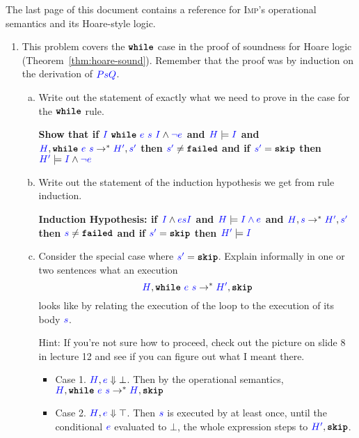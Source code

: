 \documentclass{article}
\theoremstyle{definition}
\newcommand{\meta}[1]{{\color{blue}#1}}
\newcommand{\imp}{\textsc{Imp}}
\newcommand{\progtext}[1]{\ensuremath{\text{\ttfamily\bfseries #1}}}
\newcommand{\impskip}{\progtext{skip}}
\newcommand{\failed}{\progtext{failed}}
\newcommand{\while}{\progtext{while}}
\begin{document}
\noindent{}The last page of this document contains a reference for \imp{}'s operational semantics and its Hoare-style logic.
\begin{enumerate}[start=1,label={{\bf Problem \arabic*}.},ref=\arabic*,left=0pt..0pt,widest*=10,align=left,itemindent=*]
\item This problem covers the $\while$ case in the proof of soundness for Hoare
  logic (Theorem~\ref{thm:hoare-sound}). Remember that the proof was by
  induction on the derivation of $\set{\meta{P}}\meta{s}\set{\meta{Q}}$.
  \begin{enumerate}[(a),left=1em]
  \item Write out the statement of exactly what we need to prove in the case for the $\while$ rule.
  
    \textbf{Show that if $\set{\meta{I}}\ \while\ \meta{e}\ \meta{s}\ \set{\meta{I}\wedge\meta{\neg e}}$ and $\meta{H}\models \meta{I}$ and $\meta{H},\while\ \meta{e}\ \meta{s} \to^* \meta{H^\prime},\meta{s^\prime}$ then $\meta{s^\prime}\neq \failed$ and if $\meta{s^\prime}=\impskip$ then $\meta{H^\prime} \models \meta{I}\wedge \meta{\neg e}$}

  \item Write out the statement of the induction hypothesis we get from rule induction.
  
  \textbf{Induction Hypothesis: if $\set{\meta{I}\wedge \meta{e}}\meta{s}\set{\meta{I}}$ and $\meta{H}\models\meta{\meta{I}\wedge \meta{e}}$ and $\meta{H},\meta{s}\to^* \meta{H^\prime},\meta{s^\prime}$ then $\meta{s}\neq\failed$ and if $\meta{s^\prime}=\impskip$ then $\meta{H^\prime} \models 
  \meta{I}$}

  \item Consider the special case where $\meta{s'} = \impskip$. Explain informally in one or two sentences what an execution
    \[
      \meta{H}, \while\ \meta{e}\ \meta{s} \to^* \meta{H'},\impskip
    \]
    looks like by relating the execution of the loop to the execution of its body $\meta{s}$.

    Hint: If you're not sure how to proceed, check out the picture
    on slide 8 in lecture 12 and see if you can figure out what I meant there.

    \begin{itemize}
      \item Case 1. $\meta{H}, \meta{e} \Downarrow \bot$. Then by the operational semantics, $\meta{H}, \while\ \meta{e}\ \meta{s} \to^* \meta{H}, \impskip$
      \item Case 2. $\meta{H}, \meta{e} \Downarrow \top$. Then $\meta{s}$ is executed by at least once, until the conditional $\meta{e}$ evaluated to $\bot$, the whole expression steps to $\meta{H^\prime}, \impskip$.
    \end{itemize}


\end{enumerate}
\end{enumerate}
\end{document}
